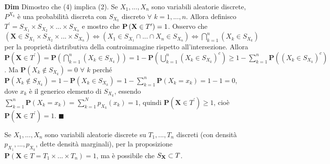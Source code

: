 \documentclass{article}
\begin{document}
\textbf{Dim} Dimostro che (4) implica (2). Se $X_{1},...,X_{n}$ sono
variabili aleatorie discrete, $P^{X_{k}}$ \`{e} una probabilit\`{a} discreta
con $S_{X_{k}}$ discreto $\forall $ $k=1,...,n$. Allora definisco $T^{\prime
}=S_{X_{1}}\times S_{X_{2}}\times ...\times S_{X_{n}}$ e mostro che $\mathbf{%
P}\left( \mathbf{X}\in T^{\prime }\right) =1$. Osservo che $\left( \mathbf{X}%
\in S_{X_{1}}\times S_{X_{2}}\times ...\times S_{X_{n}}\right)
\Longleftrightarrow \left( X_{1}\in S_{X_{1}}\cap ...\cap X_{n}\in
S_{X_{n}}\right) \Longleftrightarrow \bigcap_{k=1}^{n}\left( X_{k}\in
S_{X_{k}}\right) $ per la propriet\`{a} distributiva della controimmagine
rispetto all'intersezione. Allora $\mathbf{P}\left( \mathbf{X}\in T^{\prime
}\right) =\mathbf{P}\left( \bigcap_{k=1}^{n}\left( X_{k}\in S_{X_{k}}\right)
\right) =1-\mathbf{P}\left( \bigcup_{k=1}^{n}\left( X_{k}\in
S_{X_{k}}\right) ^{c}\right) \geq 1-\sum_{k=1}^{n}\mathbf{P}\left( \left(
X_{k}\in S_{X_{k}}\right) ^{c}\right) $. Ma $\mathbf{P}\left( X_{k}\not\in
S_{X_{k}}\right) =0$ $\forall $ $k$ perch\'{e} $\mathbf{P}\left(
X_{k}\not\in S_{X_{k}}\right) =1-\mathbf{P}\left( X_{k}\in S_{X_{k}}\right)
=1-\sum_{k=1}^{n}\mathbf{P}\left( X_{k}=x_{k}\right) =1-1=0$, dove $x_{k}$ 
\`{e} il generico elemento di $S_{X_{k}}$, essendo $\sum_{k=1}^{n}\mathbf{P}%
\left( X_{k}=x_{k}\right) =\sum_{k=1}^{N}p_{X_{k}}\left( x_{k}\right) =1$,
quindi $\mathbf{P}\left( \mathbf{X}\in T^{\prime }\right) \geq 1$, cio\`{e} $%
\mathbf{P}\left( \mathbf{X}\in T^{\prime }\right) =1$. $\blacksquare $

Se $X_{1},...,X_{n}$ sono variabili aleatorie discrete su $T_{1},...,T_{n}$
discreti (con densit\`{a} $p_{X_{1}},...,p_{X_{k}}$, dette densit\`{a}
marginali), per la proposizione $\mathbf{P}\left( \mathbf{X}\in
T=T_{1}\times ...\times T_{n}\right) =1$, ma \`{e} possibile che $S_{\mathbf{%
X}}\subset T$.
\end{document}

